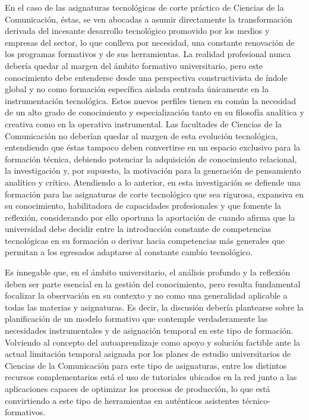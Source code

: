 \documentclass[spanish]{textolivre}
\begin{document}
En el caso de las asignaturas tecnológicas de corte práctico de Ciencias de la Comunicación, éstas, se ven abocadas a asumir directamente la transformación derivada del incesante desarrollo tecnológico promovido por los medios y empresas del sector, lo que conlleva por necesidad, una constante renovación de los programas formativos y de sus herramientas. La realidad profesional nunca debería quedar al margen del ámbito formativo universitario, pero este conocimiento debe entenderse desde una perspectiva constructivista de índole global y no como formación específica aislada centrada únicamente en la instrumentación tecnológica. Estos nuevos perfiles tienen en común la necesidad de un alto grado de conocimiento y especialización tanto en su filosofía analítica y creativa como en la operativa instrumental. Las facultades de Ciencias de la Comunicación no deberían quedar al margen de esta evolución tecnológica, entendiendo que éstas tampoco deben convertirse en un espacio exclusivo para la formación técnica, debiendo potenciar la adquisición de conocimiento relacional, la investigación y, por supuesto, la motivación para la generación de pensamiento analítico y crítico. Atendiendo a lo anterior, en esta investigación se defiende una formación para las asignaturas de corte tecnológico que sea rigurosa, expansiva en su conocimiento, habilitadora de capacidades profesionales y que fomente la reflexión, considerando por ello oportuna la aportación de \textcite{besalu-casademont_competencias_2017} cuando afirma que la universidad debe decidir entre la introducción constante de competencias tecnológicas en su formación o derivar hacia competencias más generales que permitan a los egresados adaptarse al constante cambio tecnológico. 

Es innegable que, en el ámbito universitario, el análisis profundo y la reflexión deben ser parte esencial en la gestión del conocimiento, pero resulta fundamental focalizar la observación en su contexto y no como una generalidad aplicable a todas las materias y asignaturas. Es decir, la discusión debería plantearse sobre la planificación de un modelo formativo que contemple verdaderamente las necesidades instrumentales y de asignación temporal en este tipo de formación. Volviendo al concepto del autoaprendizaje como apoyo y solución factible ante la actual limitación temporal asignada por los planes de estudio universitarios de Ciencias de la Comunicación para este tipo de asignaturas, entre los distintos recursos complementarios está el uso de tutoriales ubicados en la red junto a las aplicaciones capaces de optimizar los procesos de producción, lo que está convirtiendo a este tipo de herramientas en auténticos asistentes técnico-formativos. 
\end{document}
